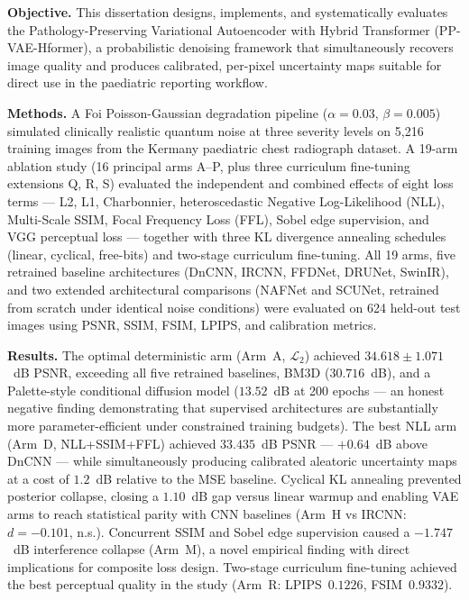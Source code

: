 \documentclass[12pt, a4paper, twoside, openright]{book}
\begin{document}
\textbf{Objective.}
This dissertation designs, implements, and systematically evaluates the Pathology-Preserving Variational Autoencoder with Hybrid Transformer (PP-VAE-Hformer), a probabilistic denoising framework that simultaneously recovers image quality and produces calibrated, per-pixel uncertainty maps suitable for direct use in the paediatric reporting workflow.

\textbf{Methods.}
A Foi Poisson-Gaussian degradation pipeline ($\alpha{=}0.03$, $\beta{=}0.005$) simulated clinically realistic quantum noise at three severity levels on 5,216 training images from the Kermany paediatric chest radiograph dataset. A 19-arm ablation study (16 principal arms A–P, plus three curriculum fine-tuning extensions Q, R, S) evaluated the independent and combined effects of eight loss terms — L2, L1, Charbonnier, heteroscedastic Negative Log-Likelihood (NLL), Multi-Scale SSIM, Focal Frequency Loss (FFL), Sobel edge supervision, and VGG perceptual loss — together with three KL divergence annealing schedules (linear, cyclical, free-bits) and two-stage curriculum fine-tuning. All 19 arms, five retrained baseline architectures (DnCNN, IRCNN, FFDNet, DRUNet, SwinIR), and two extended architectural comparisons (NAFNet and SCUNet, retrained from scratch under identical noise conditions) were evaluated on 624 held-out test images using PSNR, SSIM, FSIM, LPIPS, and calibration metrics.

\textbf{Results.}
The optimal deterministic arm (Arm~A, $\mathcal{L}_2$) achieved $34.618 \pm 1.071$~dB PSNR, exceeding all five retrained baselines, BM3D ($30.716$~dB), and a Palette-style conditional diffusion model ($13.52$~dB at 200 epochs — an honest negative finding demonstrating that supervised architectures are substantially more parameter-efficient under constrained training budgets). The best NLL arm (Arm~D, NLL+SSIM+FFL) achieved $33.435$~dB PSNR — $+0.64$~dB above DnCNN — while simultaneously producing calibrated aleatoric uncertainty maps at a cost of $1.2$~dB relative to the MSE baseline. Cyclical KL annealing prevented posterior collapse, closing a $1.10$~dB gap versus linear warmup and enabling VAE arms to reach statistical parity with CNN baselines (Arm~H vs IRCNN: $d{=}{-}0.101$, n.s.). Concurrent SSIM and Sobel edge supervision caused a $-1.747$~dB interference collapse (Arm~M), a novel empirical finding with direct implications for composite loss design. Two-stage curriculum fine-tuning achieved the best perceptual quality in the study (Arm~R: LPIPS~$0.1226$, FSIM~$0.9332$).
\end{document}
